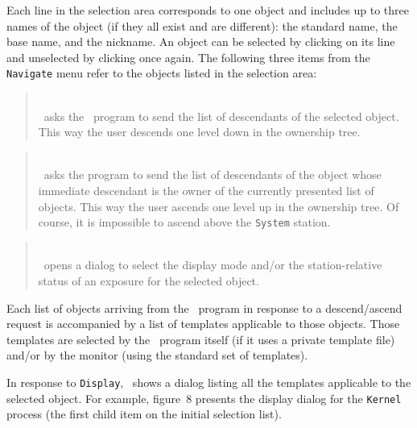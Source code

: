 Each line in the selection area corresponds to one object and includes
up to three names of the object (if they all exist and are different):
the standard name, the base name, and the nickname.
An object can be selected by clicking on its line and unselected by clicking
once again.
The following three items from the {\tt Navigate} menu refer to the
objects listed in the selection area:
\medskip

\begin{quote}
\noindent{}\\ \hspace{0in}
\dsd\ asks the \smurph\ program to send the list of descendants of the
selected object.
This way the user descends one level down in the ownership tree.
\end{quote}

\begin{quote}
\noindent{}\\ \hspace{0in}
\dsd\ asks the program to send the list of descendants of the object whose
immediate descendant is the owner of the currently presented list of objects.
This way the user ascends one level up in the ownership tree.
Of course, it is impossible to ascend above the {\tt System} station.
\end{quote}

\begin{quote}
\noindent{}\\ \hspace{0in}
\dsd\ opens a dialog to select the display mode and/or the station-relative
status of an exposure for the selected object.
\end{quote}
\medskip

Each list of objects arriving from the \smurph\ program in response to a
descend/ascend request is accompanied by a list of templates applicable to
those objects.
Those templates are selected by the \smurph\ program itself (if it uses a
private template file) and/or by the monitor (using the standard set of
templates).

In response to {\tt Display}, \dsd\ shows a dialog listing all the templates
applicable to the selected object.
For example,
figure~8
presents the display dialog for the {\tt Kernel}
process (the first child item on the initial selection list).

